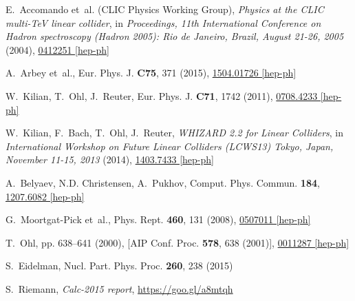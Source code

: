 \documentclass[%
 reprint,
amsmath,
amssymb,
 aps,
 prb,
 floatfix,
]{revtex4-1}
\begin{document}
\begin{thebibliography}{30}
E.~Accomando et~al. (CLIC Physics Working Group), \emph{{Physics at the CLIC
  multi-TeV linear collider}}, in \emph{{Proceedings, 11th International
  Conference on Hadron spectroscopy (Hadron 2005): Rio de Janeiro, Brazil,
  August 21-26, 2005}} (2004),
  \href{http://xxx.lanl.gov/abs/hep-ph/0412251}{0412251 [hep-ph]}

  A.~Arbey et~al., Eur. Phys. J. \textbf{C75}, 371 (2015),
  \href{http://xxx.lanl.gov/abs/hep-ph/1504.01726}{1504.01726 [hep-ph]}
  
W.~Kilian, T.~Ohl, J.~Reuter, Eur. Phys. J. \textbf{C71}, 1742 (2011),
\texttt{}
  \href{http://xxx.lanl.gov/abs/hep-ph/0708.4233}{0708.4233 [hep-ph]}

W.~Kilian, F.~Bach, T.~Ohl, J.~Reuter, \emph{{WHIZARD 2.2 for Linear
  Colliders}}, in \emph{{International Workshop on Future Linear Colliders
    (LCWS13) Tokyo, Japan, November 11-15, 2013}} (2014),
  \href{http://xxx.lanl.gov/abs/hep-ph/1403.7433}{1403.7433 [hep-ph]}

A.~Belyaev, N.D. Christensen, A.~Pukhov, Comput. Phys. Commun. \textbf{184},
  \href{http://xxx.lanl.gov/abs/hep-ph/1207.6082}{1207.6082 [hep-ph]}
  
G.~Moortgat-Pick et~al., Phys. Rept. \textbf{460}, 131 (2008),
  \href{http://xxx.lanl.gov/abs/hep-ph/0507011}{0507011 [hep-ph]}

T.~Ohl, pp. 638--641 (2000), [AIP Conf. Proc. {\bf 578}, 638 (2001)],
  \href{http://xxx.lanl.gov/abs/hep-ph/0011287}{0011287 [hep-ph]}

S.~Eidelman, Nucl. Part. Phys. Proc. \textbf{260}, 238 (2015)

S.~Riemann, {\it Calc-2015 report}, \href{https://goo.gl/a8mtqh}{https://goo.gl/a8mtqh}

\end{thebibliography}
\end{document}

